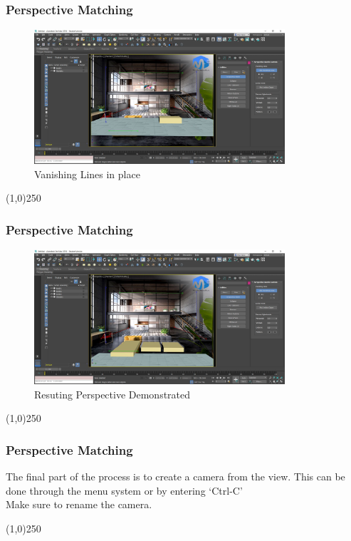 \begin{frame}
	\frametitle{Perspective Matching}
	\begin{figure}
		\centering
		\includegraphics[height=5cm]{./img/PerspectiveMatching/6.jpg}
		\caption[Vanishing Lines in place]{Vanishing Lines in place}
		\label{fig:PerspectiveMatch6}
	\end{figure}
\end{frame}
\begin{center}\line(1,0){250}\end{center}



\begin{frame}
	\frametitle{Perspective Matching}
	\begin{figure}
		\centering
		\includegraphics[height=5cm]{./img/PerspectiveMatching/7.jpg}
		\caption[Resuting Perspective Demonstrated]{Resuting Perspective Demonstrated}
		\label{fig:PerspectiveMatch7}
	\end{figure}
\end{frame}
\begin{center}\line(1,0){250}\end{center}


\begin{frame}
	\frametitle{Perspective Matching}
	The final part of the process is to create a camera from the view.  This can be done through the menu system or by entering `Ctrl-C'\\
	Make sure to rename the camera.
	
\end{frame}
\begin{center}\line(1,0){250}\end{center}





